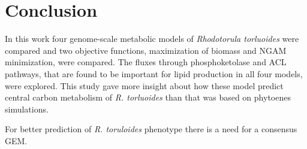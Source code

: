 \chapter{Conclusion}

In this work four genome-scale metabolic models of \textit{Rhodotorula torluoides} were compared and two objective functions, maximization of biomass and NGAM minimization, 
were compared. The fluxes through phosphoketolase and ACL pathways, that are found to be important for lipid production in all four models, were explored. 
This study gave more insight about how these model predict central carbon metabolism of \textit{R. torluoides} than \cite{DeBiaggi2023} that was based on phytoenes simulations. %








For better prediction of \textit{R. toruloides} phenotype there is a need for a consensus GEM.

